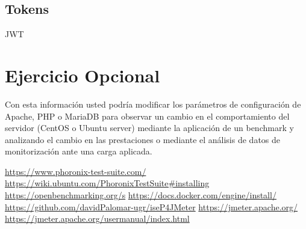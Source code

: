 \documentclass[a4paper]{article}
\begin{document}
\subsection{Tokens}
JWT
\section{Ejercicio Opcional}
Con esta información usted podría modificar los parámetros
de configuración de Apache, PHP o MariaDB para observar un cambio en el
comportamiento del servidor (CentOS o Ubuntu server) mediante la aplicación
de un benchmark y analizando el cambio en las prestaciones o mediante el análisis
de datos de monitorización ante una carga aplicada.
\newpage
\begin{thebibliography}{99}
    \href{https://www.phoronix-test-suite.com/}{https://www.phoronix-test-suite.com/}
    \href{https://wiki.ubuntu.com/PhoronixTestSuite#installing}{https://wiki.ubuntu.com/PhoronixTestSuite\#installing}
    \href{https://openbenchmarking.org/s}{https://openbenchmarking.org/s}
    \href{https://docs.docker.com/engine/install/}{https://docs.docker.com/engine/install/}
    \href{https://github.com/davidPalomar-ugr/iseP4JMeter}{https://github.com/davidPalomar-ugr/iseP4JMeter}
    \href{https://jmeter.apache.org/}{https://jmeter.apache.org/}
    \href{https://jmeter.apache.org/usermanual/index.html}{https://jmeter.apache.org/usermanual/index.html}
\end{thebibliography}
\end{document}
